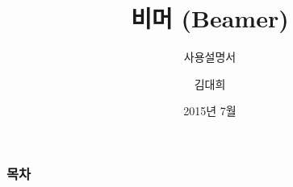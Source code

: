 \documentclass[9pt,blue,xcolor=pdftex,dvipsnames,table,handout,notes]{beamer}
\begin{document}
	

			\title{비머 (Beamer)}
			\subtitle{사용설명서}
			\author{김대희}
			\date{2015년 7월}



		\begin{frame}[plain]
		\titlepage
		\end{frame}



		\begin{frame}[plain]
		\frametitle{목차}
		\tableofcontents
		\end{frame}
\end{document}
